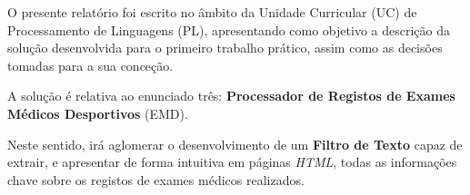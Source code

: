 \documentclass[../relatorio.tex]{subfiles}
\begin{document}
O presente relatório foi escrito no âmbito da Unidade Curricular (UC) de Processamento de Linguagens (PL), apresentando 
como objetivo a descrição da solução desenvolvida para o primeiro trabalho prático, assim como as decisões 
tomadas para a sua conceção.

A solução é relativa ao enunciado três: \textbf{Processador de Registos de Exames Médicos Desportivos} (EMD).

Neste sentido, irá aglomerar o desenvolvimento de um \textbf{Filtro de Texto} capaz de extrair, e apresentar de forma intuitiva
em páginas \textit{HTML}, todas as informações chave sobre os registos de exames médicos realizados.
\end{document}
